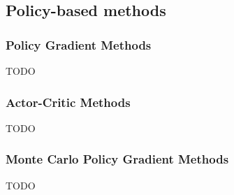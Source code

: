\documentclass[../xlapes02]{subfiles}
\begin{document}
    \subsection{Policy-based methods}\label{subsec:policy-based-methods}

    \subsubsection{Policy Gradient Methods}\label{subsubsec:policy-gradient-methods}
    TODO

    \subsubsection{Actor-Critic Methods}\label{subsubsec:actor-critic-methods}
    TODO

    \subsubsection{Monte Carlo Policy Gradient Methods}\label{subsubsec:monte-carlo-policy-gradient-methods}
    TODO
\end{document}

